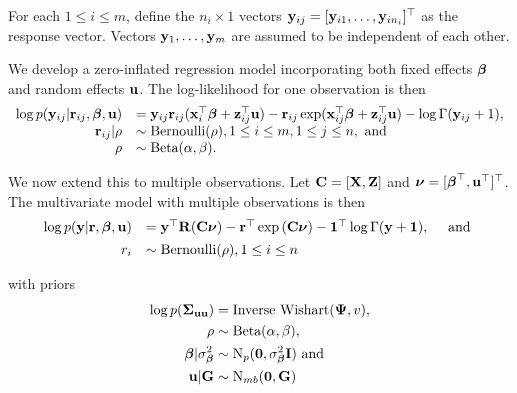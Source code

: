 For each $1 \leq i \leq m$, define the $n_i \times 1$ vectors ${\bf y}_{ij} = [{\bf y}_{i 1}, \ldots, {\bf y}_{i
n_i}]^\top$ as the response vector. Vectors ${\bf y}_1, \ldots, {\bf y}_m$ are assumed to be independent of each other.

We develop a zero-inflated regression model incorporating both fixed effects ${\boldsymbol \beta}$ and random effects
${\bf u}$. The log-likelihood for one observation is then
\[
	\begin{array}{rl}
		\log p({\bf y}_{ij} | {\bf r}_{ij}, {\boldsymbol \beta}, {\bf u}) & = {\bf y}_{ij} {\bf r}_{ij} ({\bf x}_i^\top {\boldsymbol\beta} + {\bf z}_{ij}^\top {\bf u}) - {\bf r}_{ij} \exp ({\bf x}_{ij}^\top {\boldsymbol\beta} + {\bf z}_{ij}^\top {\bf u}) - \log \Gamma ({\bf y}_{ij} + 1), \\
		{\bf r}_{ij} | \rho                  & \sim \text{Bernoulli}(\rho), 1 \leq i \leq m, 1 \leq j \leq n, \text{ and }                                                              \\
		\rho                        & \sim \text{Beta}(\alpha, \beta).                                                                                              \\
	\end{array}
\]

\noindent We now extend this to multiple observations. Let ${\bf C} = [{\bf X}, {\bf Z}]$ and ${\boldsymbol \nu} = [{\boldsymbol \beta}^\top, {\bf u}^\top]^\top$. The multivariate model with multiple observations is then
\begin{equation}\label{eq:main}
	\begin{array}{rl}
		\log{p({\bf y}|{\bf r}, {\boldsymbol\beta}, {\bf u})} & = {\bf y}^\top {\bf R} ({\bf C}{\boldsymbol \nu}) - {\bf r}^\top \exp{({\bf C}{\boldsymbol\nu})} - {\bf 1}^\top \log{\Gamma{({\bf y}+ {\bf1})}}, \quad \mbox{ and } \\ [1ex]
		r_i                           & \sim \text{Bernoulli}(\rho), 1 \leq i \leq n                                                                     \\
	\end{array}
\end{equation}

\noindent with priors
\begin{align*}
	\log{p({\boldsymbol\Sigma}_{{\bf u}{\bf u}})} & = \text{Inverse Wishart}({\boldsymbol \Psi}, v),    \\
	\rho                       & \sim \text{Beta}(\alpha, \beta),             \\
	{\boldsymbol \beta}|\sigma^2_{\boldsymbol \beta}     & \sim \text{N}_p({\bf 0}, \sigma^2_{\boldsymbol \beta} {\bf I}) \text{ and } \\
	{\bf u}|{\bf G}       & \sim \text{N}_{mb}({\bf 0}, {\bf G})              
\end{align*}

